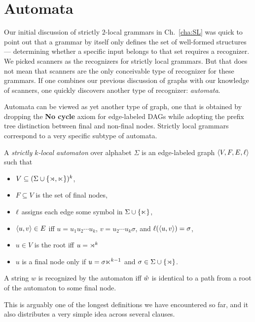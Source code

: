\section{Automata}

Our initial discussion of strictly $2$-local grammars in Ch.~\ref{cha:SL} was quick to point out that a grammar by itself only defines the set of well-formed structures --- determining whether a specific input belongs to that set requires a recognizer.
We picked scanners as the recognizers for strictly local grammars.
But that does not mean that scanners are the only conceivable type of recognizer for these grammars.
If one combines our previous discussion of graphs with our knowledge of scanners, one quickly discovers another type of recognizer: \emph{automata}.

Automata can be viewed as yet another type of graph, one that is obtained by dropping the \textbf{No cycle} axiom for edge-labeled DAGs while adopting the prefix tree distinction between final and non-final nodes.
Strictly local grammars correspond to a very specific subtype of automata.
%
\begin{definition}
    A \emph{strictly $k$-local automaton} over alphabet $\Sigma$ is an edge-labeled graph $\left \langle V, F, E, \ell \right \rangle $ such that
    \label{ex:SLImplement_Automaton}
    \begin{itemize}
        \item $V \subseteq (\Sigma \cup \left \{ \rtimes, \ltimes \right \})^k$,
        \item $F \subseteq V$ is the set of final nodes,
        \item $\ell$ assigns each edge some symbol in $\Sigma \cup \left \{ \ltimes \right \}$,
        \item $\left \langle u,v \right \rangle  \in E$ iff $u = u_1 u_2 \cdots u_k$, $v = u_2 \cdots u_k \sigma$, and $\ell(\left \langle u,v \right \rangle ) = \sigma$,
        \item $u \in V$ is the root iff $u =  \rtimes^{k}$
        \item $u$ is a final node only if $u = \sigma \ltimes^{k-1}$ and $\sigma \in \Sigma \cup \left \{ \rtimes \right \}$.
    \end{itemize}
    A string $w$ is recognized by the automaton iff $\hat{w}$ is identical to a path from a root of the automaton to some final node.
\end{definition}
%
This is arguably one of the longest definitions we have encountered so far, and it also distributes a very simple idea across several clauses.
